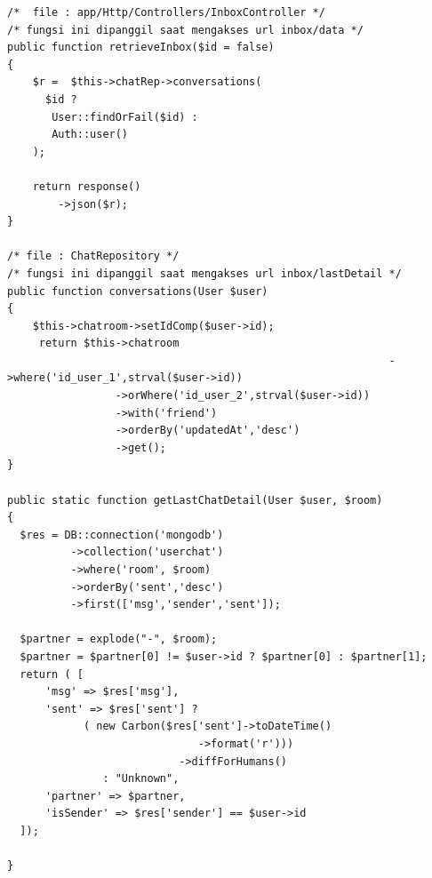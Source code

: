 \begin{lstlisting}[label=cdbe.04-05,style=php,caption=Kode Sumber \textit{Back-end} Melihat Kotak Pesan]
/*	file : app/Http/Controllers/InboxController */
/* fungsi ini dipanggil saat mengakses url inbox/data */
public function retrieveInbox($id = false)
{
    $r =  $this->chatRep->conversations(
      $id ?
       User::findOrFail($id) :
       Auth::user()
    );

    return response()
        ->json($r);
}

/* file : ChatRepository */
/* fungsi ini dipanggil saat mengakses url inbox/lastDetail */
public function conversations(User $user)
{
    $this->chatroom->setIdComp($user->id);
     return $this->chatroom
  															->where('id_user_1',strval($user->id))
                 ->orWhere('id_user_2',strval($user->id))
                 ->with('friend')
                 ->orderBy('updatedAt','desc')
                 ->get();
}

public static function getLastChatDetail(User $user, $room)
{
  $res = DB::connection('mongodb')
          ->collection('userchat')
          ->where('room', $room)
          ->orderBy('sent','desc')
          ->first(['msg','sender','sent']);

  $partner = explode("-", $room);
  $partner = $partner[0] != $user->id ? $partner[0] : $partner[1];
  return ( [
      'msg' => $res['msg'],
      'sent' => $res['sent'] ?
        	( new Carbon($res['sent']->toDateTime()
        		              ->format('r')))
        	               ->diffForHumans() 
        	   : "Unknown",
      'partner' => $partner,
      'isSender' => $res['sender'] == $user->id
  ]);

}

\end{lstlisting}

